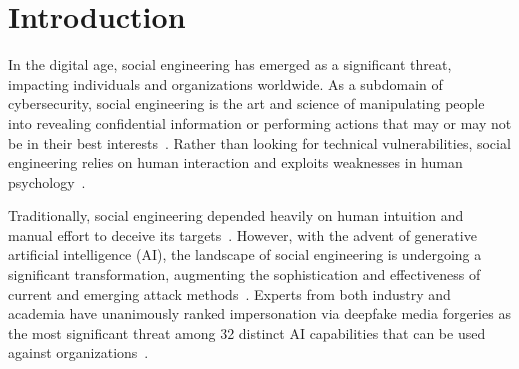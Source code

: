 

\chapter{Introduction\label{chapter:intro}}
\begin{comment}
- Independent of platform, age of equipment, software, antivirus, firewall (defining social engineering)
- pääasia päälauseeseen tai paragrafin ensimmäiseen virkkeeseen
- vältä liian pitkiä ja monimutkaisia rakenteita, mutta tuo selkeästi esiin asioiden väliset syyt ja seuraukset
- lauseenvastikkeiden käyttö vain niille sopivissa paikoissa
- havainnoillisesti käyttäen konkretisointeja, esimerkkejä, case-study tutkimuksia, kuvia, taulukoita
- 

\end{comment}


%
%
In the digital age, social engineering has emerged as a significant threat, impacting individuals and organizations worldwide. As a subdomain of cybersecurity, social engineering is the art and science of manipulating people into revealing confidential information or performing actions that may or may not be in their best interests~\citep{hadnagy_Social_Engineering_The_Science_2018}. Rather than looking for technical vulnerabilities, social engineering relies on human interaction and exploits weaknesses in human psychology~\citep{wang_Defining_Social_Engineering_2020}.





%
%
Traditionally, social engineering depended heavily on human intuition and manual effort to deceive its targets~\citep{mitnick_The_Art_of_Deception_2003, mirsky_Threat_Offensive_AI_Organizations_2023}. However, with the advent of generative artificial intelligence (AI), the landscape of social engineering is undergoing a significant transformation, augmenting the sophistication and effectiveness of current and emerging attack methods~\citep{fakhouri_AI_Driven_Solutions_SE_Attacks_2024, ibm_Cost_Data_Breach_Report_2024, verizon_Data_Breach_Investigations_Report_2024}. Experts from both industry and academia have unanimously ranked impersonation via deepfake media forgeries as the most significant threat among 32 distinct AI capabilities that can be used against organizations~\citep{mirsky_Threat_Offensive_AI_Organizations_2023}.







